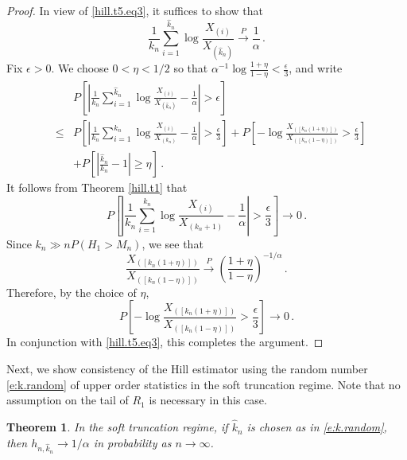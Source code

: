 \documentclass[11pt]{amsart}
\newtheorem{theorem}{Theorem}[section]
\numberwithin{equation}{section}
\begin{document}
\begin{proof}
In view of  \eqref{hill.t5.eq3}, it suffices to show that
$$
\frac1{k_n}\sum_{i=1}^{\hat k_n}\log\frac{X_{(i)}}{X_{(\hat
    k_n)}}\stackrel P\longrightarrow\frac1\alpha\,.
$$
Fix $\epsilon>0$. We choose $0<\eta<1/2$ so that
$\alpha^{-1}\log\frac{1+\eta}{1-\eta}<\frac\epsilon3$, and write 
\begin{eqnarray*}
&&P\left[\left|\frac1{k_n}\sum_{i=1}^{\hat
      k_n}\log\frac{X_{(i)}}{X_{(\hat
        k_n)}}-\frac1\alpha\right|>\epsilon\right]\\ 
&\le&P\left[\left|\frac1{k_n}\sum_{i=1}^{k_n}\log\frac{X_{(i)}}{X_{(k_n)}}
-\frac1\alpha\right|>\frac\epsilon3\right] 
+P\left[-\log\frac{X_{([k_n(1+\eta)])}}{X_{([k_n(1-\eta)])}}>\frac\epsilon3\right]\\ 
&&+P\left[\left|\frac{\hat k_n}{k_n}-1\right|\ge\eta\right]\,.
\end{eqnarray*}
It follows from Theorem \ref{hill.t1} that
$$
P\left[\left|\frac1{k_n}\sum_{i=1}^{k_n}\log\frac{X_{(i)}}{X_{(k_n+1)}}
-\frac1\alpha\right|>\frac\epsilon3\right]\longrightarrow0\,.
$$ 
Since $k_n\gg nP(H_1>M_n)$, we see that 
$$
\frac{X_{([k_n(1+\eta)])}}{X_{([k_n(1-\eta)])}}\stackrel
P\longrightarrow\left(\frac{1+\eta}{1-\eta}\right)^{-1/\alpha}\,.
$$ 
Therefore, by the choice of $\eta$, 
$$
P\left[-\log\frac{X_{([k_n(1+\eta)])}}{X_{([k_n(1-\eta)])}}>\frac\epsilon3\right]
\longrightarrow0\,.
$$ 
In conjunction with \eqref{hill.t5.eq3}, this completes the argument. 
\end{proof}

Next, we show consistency of the Hill estimator using the random
number \eqref{e:k.random} of upper order statistics in the soft
truncation regime. Note that no 
assumption on the tail of $R_1$ is necessary in this case. 

\begin{theorem}\label{hill.t6} In the soft truncation regime, if $\hat
  k_n$ is chosen as in \eqref{e:k.random}, then $h_{n,\hat k_n} 
\to 1/\alpha$ in probability as $n\to\infty$. 
\end{theorem}
\end{document}
